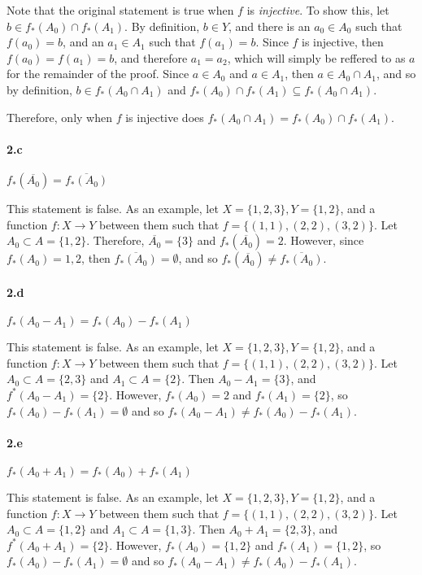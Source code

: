 \documentclass[12pt, letterpaper]{article}
\begin{document}
Note that the original statement is true when \(f\) is \emph{injective}. 
To show this, let \(b \in f_*(A_0) \cap f_*(A_1)\). By definition, \(b \in Y\), and there is an \(a_0 \in A_0\) such that \(f(a_0) = b\), and an \(a_1 \in A_1\) such that \(f(a_1) = b\). Since \(f\) is injective, then \(f(a_0) = f(a_1) = b\), and therefore \(a_1 = a_2\), which will simply be reffered to as \(a\) for the remainder of the proof. Since \(a \in A_0\) and \(a \in A_1\), then \(a \in A_0 \cap A_1\), and so by definition, \(b \in f_*(A_0 \cap A_1)\) and \(f_*(A_0) \cap f_*(A_1) \subseteq f_*(A_0 \cap A_1)\).

Therefore, only when \(f\) is injective does \(f_*(A_0 \cap A_1) = f_*(A_0) \cap f_*(A_1)\).

\paragraph{2.c} \(f_*(\overline{A_0}) = \overline{f_*(A_0)}\) 

This statement is false. As an example, let \(X = \{1,2,3\}, Y = \{1, 2\}\), and a function \(f: X \rightarrow Y\) between them such that \(f= \{(1,1), (2,2), (3,2)\}\). Let \(A_0 \subset A = \{1, 2\}\). Therefore, \(\overline{A_0} = \{3\}\) and \(f_*(\overline{A_0}) = 2\). However,  since \(f_*(A_0)= {1,2}\), then \( \overline{f_*(A_0)}= \emptyset\), and so \(f_*(\overline{A_0}) \neq \overline{f_*(A_0)}\). 

\paragraph{2.d} \(f_*(A_0 - A_1) = f_*(A_0) - f_*(A_1)\)

This statement is false. As an example, let \(X = \{1,2,3\}, Y = \{1, 2\}\), and a function \(f: X \rightarrow Y\) between them such that \(f= \{(1,1), (2,2), (3,2)\}\). Let \(A_0 \subset A = \{2, 3\}\) and \(A_1 \subset A = \{2\}\). Then  \(A_0 - A_1 = \{3\}\), and   \(f^*(A_0 - A_1) = \{2\}\). However, \(f_*(A_0) = {2}\) and \( f_*(A_1) = \{2\}\), so \(f_*(A_0) - f_*(A_1) = \emptyset\) and so \(f_*(A_0 - A_1) \neq f_*(A_0) - f_*(A_1)\).

\paragraph {2.e} \(f_*(A_0 + A_1) = f_*(A_0) + f_*(A_1)\)

This statement is false. As an example, let \(X = \{1,2,3\}, Y = \{1,2\}\), and a function \(f: X \rightarrow Y\) between them such that \(f= \{(1,1), (2,2), (3,2)\}\). Let \(A_0 \subset A = \{1, 2\}\) and \(A_1 \subset A = \{1, 3\}\). Then  \(A_0 + A_1 = \{2, 3\}\), and   \(f^*(A_0 + A_1) = \{2\}\). However, \(f_*(A_0) = \{1,2\}\) and \( f_*(A_1) = \{1,2\}\), so \(f_*(A_0) - f_*(A_1) = \emptyset\) and so \(f_*(A_0 - A_1) \neq f_*(A_0) - f_*(A_1)\).
\end{document}
